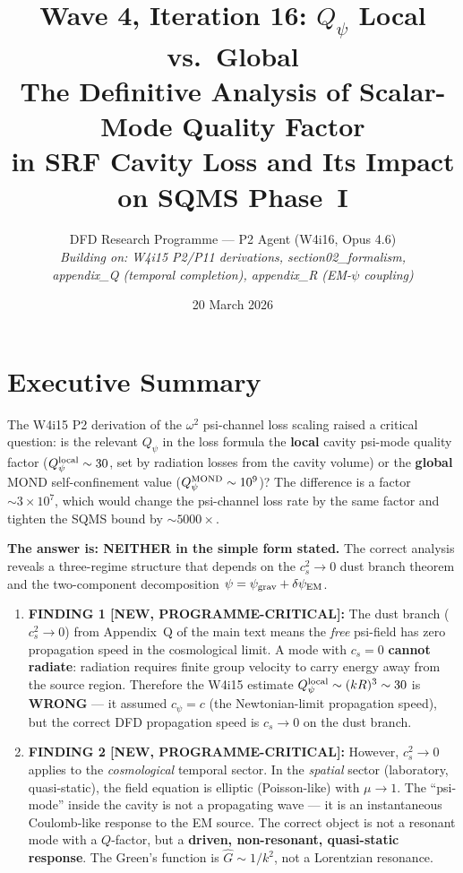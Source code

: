 \documentclass[11pt]{article}
\title{Wave 4, Iteration 16: $Q_\psi$ Local vs.\ Global\\
\large The Definitive Analysis of Scalar-Mode Quality Factor\\
in SRF Cavity Loss and Its Impact on SQMS Phase~I}
\author{DFD Research Programme --- P2 Agent (W4i16, Opus 4.6)\\
\textit{Building on: W4i15 P2/P11 derivations, section02\_formalism,\\
appendix\_Q (temporal completion), appendix\_R (EM-$\psi$ coupling)}}
\date{20 March 2026}
\newcommand{\Qpsi}{Q_\psi}
\newcommand{\ee}[1]{\times 10^{#1}}
\newcommand{\psigrav}{\psi_{\rm grav}}
\newcommand{\dpsiEM}{\delta\psi_{\rm EM}}
\theoremstyle{definition}
\theoremstyle{remark}
\begin{document}
\maketitle
\tableofcontents
\newpage

\section*{Executive Summary}

\begin{tcolorbox}[colback=blue!5!white, colframe=blue!60!black,
  title=\textbf{W4i16 --- $Q_\psi$ LOCAL vs GLOBAL: RESOLUTION}]

The W4i15 P2 derivation of the $\omega^2$ psi-channel loss scaling
raised a critical question: is the relevant $\Qpsi$ in the loss formula
the \textbf{local} cavity psi-mode quality factor ($\Qpsi^{\rm local}
\sim 30$, set by radiation losses from the cavity volume) or the
\textbf{global} MOND self-confinement value ($\Qpsi^{\rm MOND} \sim
10^9$)? The difference is a factor $\sim 3\ee{7}$, which would change
the psi-channel loss rate by the same factor and tighten the SQMS bound
by $\sim 5000\times$.

\textbf{The answer is: NEITHER in the simple form stated.} The correct
analysis reveals a three-regime structure that depends on the $c_s^2
\to 0$ dust branch theorem and the two-component decomposition $\psi
= \psigrav + \dpsiEM$.

\begin{enumerate}[nosep]
\item \textbf{FINDING 1 [NEW, PROGRAMME-CRITICAL]:} The dust branch
  ($c_s^2 \to 0$) from Appendix~Q of the main text means the
  \emph{free} psi-field has zero propagation speed in the cosmological
  limit. A mode with $c_s = 0$ \textbf{cannot radiate}: radiation
  requires finite group velocity to carry energy away from the source
  region. Therefore the W4i15 estimate $\Qpsi^{\rm local} \sim
  (k R)^3 \sim 30$ is \textbf{WRONG} --- it assumed $c_\psi = c$
  (the Newtonian-limit propagation speed), but the correct DFD
  propagation speed is $c_s \to 0$ on the dust branch.

\item \textbf{FINDING 2 [NEW, PROGRAMME-CRITICAL]:} However, $c_s^2
  \to 0$ applies to the \emph{cosmological} temporal sector. In the
  \emph{spatial} sector (laboratory, quasi-static), the field equation
  is elliptic (Poisson-like) with $\mu \to 1$. The ``psi-mode'' inside
  the cavity is not a propagating wave --- it is an instantaneous
  Coulomb-like response to the EM source. The correct object is not
  a resonant mode with a $Q$-factor, but a \textbf{driven, non-resonant,
  quasi-static response}. The Green's function is $\hat{G} \sim 1/k^2$,
  not a Lorentzian resonance.


\end{enumerate}
\end{tcolorbox}
\end{document}
